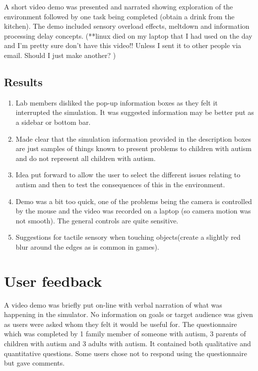 \documentclass[11pt]{report}
\begin{document}
A short video demo was presented and narrated showing exploration of the environment followed by one task being completed (obtain a drink from the kitchen). The demo included sensory overload effects, meltdown and information processing delay concepts. (**linux died on my laptop that I had used on the day and I'm pretty sure don't have this video!! Unless I sent it to other people via email. Should I just make another? )

\subsection{Results}

\begin{enumerate}
\item Lab members disliked the pop-up information boxes as they felt it interrupted the simulation. It was suggested information may be better put as a sidebar or bottom bar.
\item Made clear that the simulation information provided in the description boxes are just samples of things known to present problems to children with autism and do not represent all children with autism.
\item Idea put forward to allow the user to select the different issues relating to autism and then to test the consequences of this in the environment. 
\item Demo was a bit too quick, one of the problems being the camera is controlled by the mouse and the video was recorded on a laptop (so camera motion was not smooth). The general controls are quite sensitive.
\item Suggestions for tactile sensory when touching objects(create a slightly red blur around the edges as is common in games).
\end{enumerate}


\section{User feedback}
A video demo was briefly put on-line with verbal narration of what was happening in the simulator. No information on goals or target audience was given as users were asked whom they felt it would be useful for. The questionnaire which was completed by 1 family member of someone with autism, 3 parents of children with autism and 3 adults with autism. It contained both qualitative and quantitative questions. Some users chose not to respond using the questionnaire but gave comments. 
\end{document}
